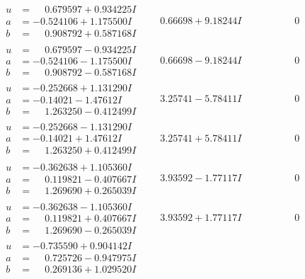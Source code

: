 \documentclass[1p]{elsarticle_modified}
\theoremstyle{definition}
\begin{document}
$$\begin{array}{c|c|c}
\begin{aligned}
u &= \phantom{-}0.679597 + 0.934225 I \\
a &= -0.524106 + 1.175500 I \\
b &= \phantom{-}0.908792 + 0.587168 I\end{aligned}
 & \phantom{-}0.66698 + 9.18244 I & \phantom{-0.000000 } 0 \\ \hline\begin{aligned}
u &= \phantom{-}0.679597 - 0.934225 I \\
a &= -0.524106 - 1.175500 I \\
b &= \phantom{-}0.908792 - 0.587168 I\end{aligned}
 & \phantom{-}0.66698 - 9.18244 I & \phantom{-0.000000 } 0 \\ \hline\begin{aligned}
u &= -0.252668 + 1.131290 I \\
a &= -0.14021 - 1.47612 I \\
b &= \phantom{-}1.263250 - 0.412499 I\end{aligned}
 & \phantom{-}3.25741 - 5.78411 I & \phantom{-0.000000 } 0 \\ \hline\begin{aligned}
u &= -0.252668 - 1.131290 I \\
a &= -0.14021 + 1.47612 I \\
b &= \phantom{-}1.263250 + 0.412499 I\end{aligned}
 & \phantom{-}3.25741 + 5.78411 I & \phantom{-0.000000 } 0 \\ \hline\begin{aligned}
u &= -0.362638 + 1.105360 I \\
a &= \phantom{-}0.119821 - 0.407667 I \\
b &= \phantom{-}1.269690 + 0.265039 I\end{aligned}
 & \phantom{-}3.93592 - 1.77117 I & \phantom{-0.000000 } 0 \\ \hline\begin{aligned}
u &= -0.362638 - 1.105360 I \\
a &= \phantom{-}0.119821 + 0.407667 I \\
b &= \phantom{-}1.269690 - 0.265039 I\end{aligned}
 & \phantom{-}3.93592 + 1.77117 I & \phantom{-0.000000 } 0 \\ \hline\begin{aligned}
u &= -0.735590 + 0.904142 I \\
a &= \phantom{-}0.725726 - 0.947975 I \\
b &= \phantom{-}0.269136 + 1.029520 I\end{aligned}

\end{array}$$
\end{document}
